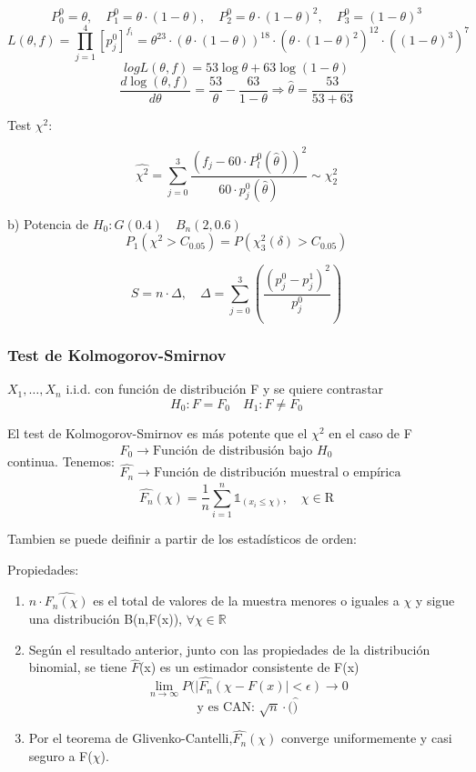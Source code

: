 \[
P_0^0=\theta, \quad P_1^0=\theta \cdot (1-\theta), \quad P_2^0=\theta \cdot (1-\theta)^2, \quad P_3^0=(1-\theta)^3
\]
\[
L(\theta,f)=\prod_{j=1}^{4}[p_j^0]^{f_i}= \theta^{23}\cdot(\theta \cdot (1-\theta))^18 \cdot (\theta \cdot (1-\theta)^2)^12 \cdot ((1-\theta)^3)^7
\]
\[
log L(\theta,f)=53 \log \theta+63 \log (1-\theta)
\]
\[
\frac{d \log(\theta,f)}{d \theta}=\frac{53}{\theta}-\frac{63}{1-\theta} \Longrightarrow \hat{\theta}=\frac{53}{53+63}
\]

Test $\chi^2$:

\[
\hat{\chi^2}=\sum_{j=0}^{3} \frac{(f_j-60\cdot P_l^0(\hat{\theta}))^2}{60 \cdot p_j^0(\hat{\theta})} \sim \chi^2_2
\]

b) Potencia de $H_0:G(0.4) \quad B_n(2,0.6)$
\[
P_1(\chi^2> C_{0.05})=P(\chi_3^2(\delta)>C_{0.05})
\]

\[
S=n \cdot \Delta, \quad \Delta=\sum_{j=0}^{3} \left(\frac{(p_j^0-p_j^1)^2}{p_j^0}\right)
\]

\subsubsection{Test de Kolmogorov-Smirnov}

$X_1,\dots, X_n$ i.i.d. con función de distribución F y se quiere contrastar
\[
H_0: F=F_0 \quad H_1: F \neq F_0
\]

El test de Kolmogorov-Smirnov es más potente que el $\chi^2$ en el caso de F continua.
Tenemos:\(
\begin{matrix}
    F_0 \to \text{Función de distribusión bajo }H_0\\
    \hat{F_n} \to \text{Función de distribución muestral o empírica}
\end{matrix}
\)
\[
\hat{F_n}(\chi)=\frac{1}{n} \sum_{i=1}^{n} \mathbb{1}_{(x_i \leq \chi)}, \quad \chi \in \mathrm{R}
\]

Tambien se puede deifinir a partir de los estadísticos de orden:

Propiedades:
\begin{enumerate}
    \item $n\cdot \hat{F_n(\chi)}$ es el total de valores de la muestra menores o iguales a $\chi$ y sigue una distribución B(n,F(x)), $\forall \chi \in \mathbb{R}$
    \item Según el resultado anterior, junto con las propiedades de la distribución binomial, se tiene $\hat{F}$(x) es un estimador consistente de F(x)
    \[
    \lim_{n \to \infty} P(| \hat{F_n}(\chi - F(x)| < \epsilon) \to 0
    \]
    \[
    \text{y es CAN: }\sqrt{n}\cdot(\hat)
    \]
    \item Por el teorema de Glivenko-Cantelli,$\hat{F_n}(\chi)$ converge uniformemente y casi seguro a F($\chi$).
\end{enumerate}

